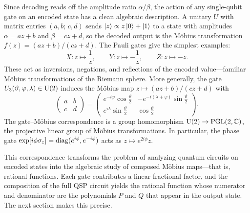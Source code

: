 Since decoding reads off the amplitude ratio $\alpha/\beta$,
the action of any single-qubit gate on an encoded state has a
clean algebraic description.  A unitary $U$ with matrix entries
$(a,b;\,c,d)$ sends $\ket{z} \propto z\ket{0} + \ket{1}$ to
a state with amplitudes $\alpha = az+b$ and $\beta = cz+d$,
so the decoded output is the M\"obius transformation
$f(z) = (az+b)/(cz+d)$.  The Pauli gates give the simplest
examples:
\begin{equation}
	X: z \mapsto \frac{1}{z}, \qquad
	Y: z \mapsto -\frac{1}{z}, \qquad
	Z: z \mapsto -z.
	\label{eq:pauli-mobius}
\end{equation}
These act as inversions, negations, and reflections of the
encoded value---familiar M\"obius transformations of the Riemann
sphere.  More generally, the gate
$U_3(\vartheta,\varphi,\lambda) \in \mathrm{U}(2)$ induces the M\"obius
map $z \mapsto (az+b)/(cz+d)$ with
\begin{equation}
	\begin{pmatrix} a & b \\ c & d \end{pmatrix} =
	\begin{pmatrix}
		e^{-i\varphi}\cos\frac{\vartheta}{2} &
		-e^{-i(\lambda+\varphi)}\sin\frac{\vartheta}{2} \\[4pt]
		e^{i\lambda}\sin\frac{\vartheta}{2}  &
		\cos\frac{\vartheta}{2}
	\end{pmatrix}.
	\label{eq:U3-mobius}
\end{equation}
The gate--M\"obius correspondence is a group homomorphism
$\mathrm{U}(2) \to \mathrm{PGL}(2,\mathbb{C})$, the projective linear
group of M\"obius transformations.
In particular, the phase gate
$\exp[i\phi\sigma_z] = \mathrm{diag}(e^{i\phi},e^{-i\phi})$
acts as $z \mapsto e^{2i\phi}z$.

This correspondence transforms the problem of analyzing quantum
circuits on encoded states into the algebraic study of composed
M\"obius maps---that is, rational functions.  Each gate
contributes a linear fractional factor, and the composition of
the full QSP circuit yields the rational function whose numerator
and denominator are the polynomials $P$ and $Q$ that appear in
the output state.  The next section makes this precise.
